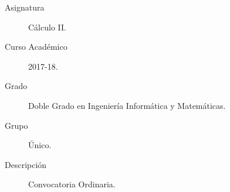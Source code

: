 \documentclass[12pt]{article}
\begin{document}

    
    

    \begin{description}
        \item[Asignatura] Cálculo II.
        \item[Curso Académico] 2017-18.
        \item[Grado] Doble Grado en Ingeniería Informática y Matemáticas.
        \item[Grupo] Único.
        \item[Descripción] Convocatoria Ordinaria.
    
    \end{description}
    \newpage
    
\end{document}
